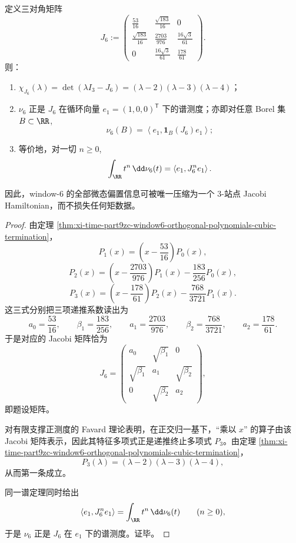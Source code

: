 \begin{theorem}\label{thm:xi-time-part9zc-window6-canonical-information-hamiltonian}
定义三对角矩阵
\[
J_6:=
\begin{pmatrix}
\frac{53}{16} & \frac{\sqrt{183}}{16} & 0\\[1mm]
\frac{\sqrt{183}}{16} & \frac{2703}{976} & \frac{16\sqrt3}{61}\\[1mm]
0 & \frac{16\sqrt3}{61} & \frac{178}{61}
\end{pmatrix}.
\]
则：
\begin{enumerate}
  \item \(\chi_{J_6}(\lambda)=\det(\lambda I_3-J_6)=(\lambda-2)(\lambda-3)(\lambda-4)\)；
  \item \(\nu_6\) 正是 \(J_6\) 在循环向量 \(e_1=(1,0,0)^{\mathsf T}\) 下的谱测度；亦即对任意 Borel 集 \(B\subset\RR\),
  \[
  \nu_6(B)=\left\langle e_1,\mathbf 1_B(J_6)e_1\right\rangle;
  \]
  \item 等价地，对一切 \(n\ge 0\),
  \[
  \int_{\RR} t^n\,\dd\nu_6(t)=\left\langle e_1,J_6^n e_1\right\rangle.
  \]
\end{enumerate}
因此，window-\(6\) 的全部微态偏置信息可被唯一压缩为一个 \(3\)-站点 Jacobi Hamiltonian，而不损失任何矩数据。
\end{theorem}
\begin{proof}
由定理 \ref{thm:xi-time-part9zc-window6-orthogonal-polynomials-cubic-termination}，
\[
P_1(x)=\left(x-\frac{53}{16}\right)P_0(x),
\]
\[
P_2(x)=\left(x-\frac{2703}{976}\right)P_1(x)-\frac{183}{256}P_0(x),
\]
\[
P_3(x)=\left(x-\frac{178}{61}\right)P_2(x)-\frac{768}{3721}P_1(x).
\]
这三式分别把三项递推系数读出为
\[
a_0=\frac{53}{16},\qquad
\beta_1=\frac{183}{256},\qquad
a_1=\frac{2703}{976},\qquad
\beta_2=\frac{768}{3721},\qquad
a_2=\frac{178}{61}.
\]
于是对应的 Jacobi 矩阵恰为
\[
J_6=
\begin{pmatrix}
a_0 & \sqrt{\beta_1} & 0\\
\sqrt{\beta_1} & a_1 & \sqrt{\beta_2}\\
0 & \sqrt{\beta_2} & a_2
\end{pmatrix},
\]
即题设矩阵。

对有限支撑正测度的 Favard 理论表明，在正交归一基下，“乘以 \(x\)” 的算子由该 Jacobi 矩阵表示，因此其特征多项式正是递推终止多项式 \(P_3\)。由定理 \ref{thm:xi-time-part9zc-window6-orthogonal-polynomials-cubic-termination}，
\[
P_3(\lambda)=(\lambda-2)(\lambda-3)(\lambda-4),
\]
从而第一条成立。

同一谱定理同时给出
\[
\left\langle e_1,J_6^n e_1\right\rangle
=
\int_{\RR}t^n\,\dd\nu_6(t)
\qquad (n\ge 0),
\]
于是 \(\nu_6\) 正是 \(J_6\) 在 \(e_1\) 下的谱测度。证毕。
\end{proof}

